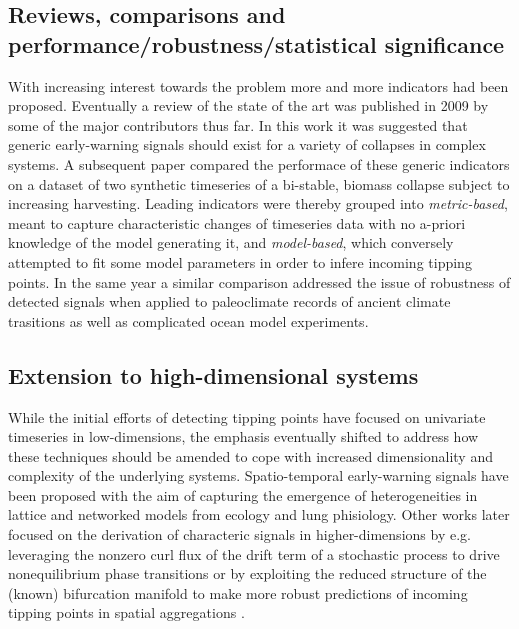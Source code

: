 \documentclass[dvipsnames, table, 11pt]{article}
\begin{document}
\subsection{Reviews, comparisons and performance/robustness/statistical significance}
With increasing interest towards the problem more and more indicators had been proposed. 
Eventually a review of the state of the art was published in 2009 \cite{Scheffer2009} by some of the major contributors thus far. 
In this work it was suggested that generic early-warning signals should exist for a variety of collapses in complex systems.
A subsequent paper \cite{Dakos2012} compared the performace of these generic indicators on a dataset of two synthetic timeseries of a bi-stable, biomass collapse subject to increasing harvesting.
Leading indicators were thereby grouped into \textit{metric-based}, meant to capture characteristic changes of timeseries data with no a-priori knowledge of the model generating it, and \textit{model-based}, which conversely attempted to fit some model parameters in order to infere incoming tipping points. 
In the same year a similar comparison \cite{Lenton2012} addressed the issue of robustness of detected signals when applied to paleoclimate records of ancient climate trasitions as well as complicated ocean model experiments. 

\subsection{Extension to high-dimensional systems}
While the initial efforts of detecting tipping points have focused on univariate timeseries in low-dimensions, the emphasis eventually shifted to address how these techniques should be amended to cope with increased dimensionality and complexity of the underlying systems. 
Spatio-temporal early-warning signals \cite{Dakos2010, Kuehn2015, Liang2017, Chen2019, Donovan2022} have been proposed with the aim of capturing the emergence of heterogeneities in lattice and networked models from ecology and lung phisiology.
Other works later focused on the derivation of characteric signals in higher-dimensions by e.g. leveraging the nonzero curl flux of the drift term of a stochastic process to drive nonequilibrium phase transitions \cite{Xu2023} or by exploiting the reduced structure of the (known) bifurcation manifold to make more robust predictions of incoming tipping points in spatial aggregations \cite{Dylewsky2024}.
\end{document}

